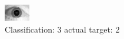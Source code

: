 \begin{figure}[h!]
\begin{center}
\includegraphics[width=0.60\columnwidth]{figures/ID1699_class_3_target_2.png}
\end{center}
\caption{ Classification: 3 actual target: 2}
\label{fig:ID1699_class_3_target_2}
\end{figure}
